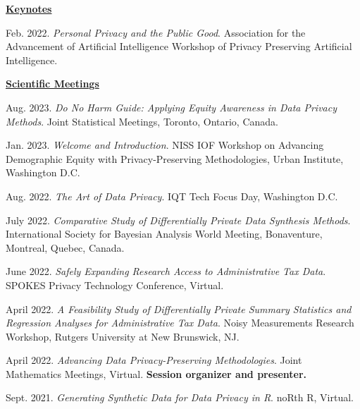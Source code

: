 \underline{\textbf{\large Keynotes}}\normalsize
\vspace{6pt}
\begin{etaremune}[topsep=0pt, itemsep=4pt, partopsep=0pt, parsep=0pt]
    \item Feb. 2022. \textit{Personal Privacy and the Public Good}. Association for the Advancement of Artificial Intelligence Workshop of Privacy Preserving Artificial Intelligence.
    
\vspace{6pt}
\hspace{-0.30in}\underline{\textbf{\large Scientific Meetings}}\normalsize
    \item Aug. 2023. \textit{Do No Harm Guide: Applying Equity Awareness in Data Privacy Methods}. Joint Statistical Meetings, Toronto, Ontario, Canada.
    
    \item Jan. 2023. \textit{Welcome and Introduction}. NISS IOF Workshop on Advancing Demographic Equity with Privacy-Preserving Methodologies, Urban Institute, Washington D.C.
    
    \item Aug. 2022. \textit{The Art of Data Privacy}. IQT Tech Focus Day, Washington D.C.
    
    \item July 2022. \textit{Comparative Study of Differentially Private Data Synthesis Methods}. International Society for Bayesian Analysis World Meeting, Bonaventure, Montreal, Quebec, Canada.
    
    \item June 2022. \textit{Safely Expanding Research Access to Administrative Tax Data}. SPOKES Privacy Technology Conference, Virtual.
    
    \item April 2022. \textit{A Feasibility Study of Differentially Private Summary Statistics and Regression Analyses for Administrative Tax Data}. Noisy Measurements Research Workshop, Rutgers University at New Brunswick, NJ.
    
    \item April 2022. \textit{Advancing Data Privacy-Preserving Methodologies}. Joint Mathematics Meetings, Virtual. \textbf{Session organizer and presenter.}

    \item Sept. 2021. \textit{Generating Synthetic Data for Data Privacy in R}. noRth R, Virtual.


\end{etaremune}

